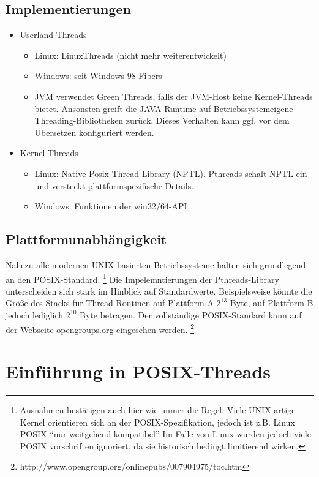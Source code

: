 \documentclass[11pt,a4paper]{article}
\begin{document}
\subsection{Implementierungen}
\begin{itemize}
	\item Userland-Threads
	\begin{itemize}
		\item Linux: LinuxThreads (nicht mehr weiterentwickelt)
		\item Windows: seit Windows 98 Fibers
		\item JVM verwendet Green Threads, falls der JVM-Host keine Kernel-Threads bietet. Ansonsten greift die JAVA-Runtime auf Betriebssystemeigene Threading-Bibliotheken zurück. Dieses Verhalten kann ggf. vor dem Übersetzen konfiguriert werden.
	\end{itemize}

	\item Kernel-Threads
	\begin{itemize}
		\item Linux: Native Posix Thread Library (NPTL). Pthreads schalt NPTL ein und versteckt plattformspezifische Details..
		\item Windows: Funktionen der win32/64-API
	\end{itemize}
\end{itemize}

\subsection{Plattformunabhängigkeit}
Nahezu alle modernen UNIX basierten Betriebssysteme halten sich grundlegend an den POSIX-Standard.
\footnote{Ausnahmen bestätigen auch hier wie immer die Regel. Viele UNIX-artige Kernel orientieren sich an der POSIX-Spezifikation, jedoch ist z.B. Linux POSIX ``nur weitgehend kompatibel'' Im Falle von Linux wurden jedoch viele POSIX vorschriften ignoriert, da sie historisch bedingt limitierend wirken.} 
Die Impelemntierungen der Pthreads-Library unterscheiden sich stark im Hinblick auf Standardwerte. Beispielsweise könnte die Größe des Stacks für Thread-Routinen auf Plattform A \(2^{13}\) Byte, auf Plattform B jedoch lediglich \(2^{10}\) Byte betragen. Der vollständige POSIX-Standard kann auf der Webseite opengroups.org eingesehen werden. \footnote{http://www.opengroup.org/onlinepubs/007904975/toc.htm}
\\

\section{Einführung in POSIX-Threads}
\end{document}

